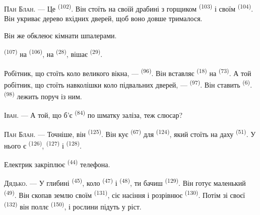 \VUsaut{3.0mm}
\VUsaut{3.0mm}

\textsc{Пан Блан}. --- Це  \textsuperscript{(102)}. Він стоїть на
своїй драбині з горщиком  \textsuperscript{(103)} і своїм
 \textsuperscript{(104)}. Він укриває дерево вхідних дверей, щоб
воно довше трималося.

Він же обклеює кімнати шпалерами.

 \textsuperscript{(107)} на 
\textsuperscript{(106)}, на  \textsuperscript{(28)}, вішає
 \textsuperscript{(29)}.

Робітник, що стоїть коло великого вікна, --- 
\textsuperscript{(96)}. Він вставляє  \textsuperscript{(18)} на
 \textsuperscript{(73)}. А той робітник, що стоїть навколішки
коло підвальних дверей, ---  \textsuperscript{(97)}. Він ставить
 \textsuperscript{(6)}.  \textsuperscript{(98)}
лежить поруч із ним.

\textsc{Іван}. --- А той, що б'є  \textsuperscript{(84)} по
шматку заліза, теж слюсар?

\textsc{Пан Блан}. --- Точніше, він  \textsuperscript{(125)}. Він
кує  \textsuperscript{(67)} для 
\textsuperscript{(124)}, який стоїть на даху 
\textsuperscript{(51)}. У нього є  \textsuperscript{(126)},
 \textsuperscript{(127)} і 
\textsuperscript{(128)}.

Електрик закріплює  \textsuperscript{(44)} телефона.

\VUsaut{3.0mm}

\textsc{Дядько}. --- У глибині  \textsuperscript{(45)}, коло
 \textsuperscript{(47)} і  \textsuperscript{(48)}, ти
бачиш  \textsuperscript{(129)}. Він готує маленький
 \textsuperscript{(49)}. Він скопав землю своїм 
\textsuperscript{(131)}, сіє насіння і розрівнює 
\textsuperscript{(130)}. Потім зі своєї 
\textsuperscript{(132)} він поллє  \textsuperscript{(150)}, і
рослини підуть у ріст.

